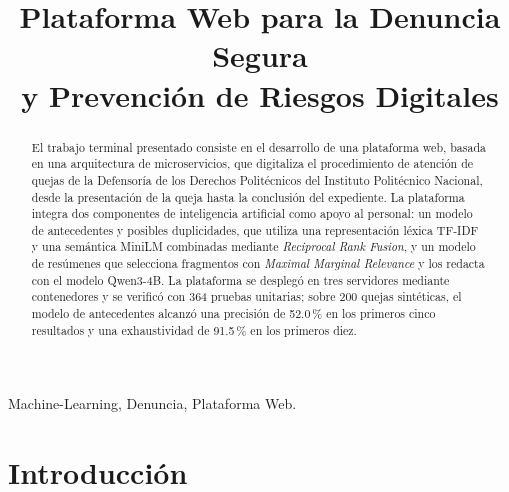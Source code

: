 \documentclass[conference,letterpaper]{IEEEtran}
\begin{document}
\title{Plataforma Web para la Denuncia Segura\\ y Prevención de Riesgos Digitales}

\author{
}

\maketitle

\begin{abstract}
El trabajo terminal presentado consiste en el desarrollo de una plataforma web, basada en una arquitectura de microservicios, que digitaliza el procedimiento de atención de quejas de la Defensoría de los Derechos Politécnicos del Instituto Politécnico Nacional, desde la presentación de la queja hasta la conclusión del expediente. La plataforma integra dos componentes de inteligencia artificial como apoyo al personal: un modelo de antecedentes y posibles duplicidades, que utiliza una representación léxica TF-IDF y una semántica MiniLM combinadas mediante \textit{Reciprocal Rank Fusion}, y un modelo de resúmenes que selecciona fragmentos con \textit{Maximal Marginal Relevance} y los redacta con el modelo Qwen3-4B. La plataforma se desplegó en tres servidores mediante contenedores y se verificó con 364 pruebas unitarias; sobre 200 quejas sintéticas, el modelo de antecedentes alcanzó una precisión de 52.0\,\% en los primeros cinco resultados y una exhaustividad de 91.5\,\% en los primeros diez.
\end{abstract}

\begin{IEEEkeywords}
Machine-Learning, Denuncia, Plataforma Web.
\end{IEEEkeywords}

\section{Introducción}
\end{document}
